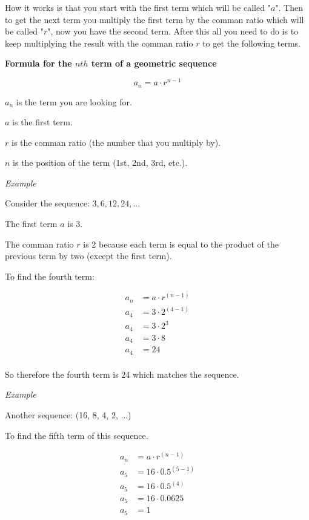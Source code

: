 \documentclass[]{book}
\begin{document}
 How it works is that you start with the first term which will be called "$ a  $". 
Then to get the next term you multiply the first term by the comman ratio which will be called  "$ r  $", now you have the second term.
After this all you need to do is to keep multiplying the result with the comman ratio $ r  $ to get the following terms.

\textbf{Formula for the  $ n th  $ term of a geometric sequence}

$$ a_{n} = a \cdot r^{n-1}$$

 $ a_{n} $ is the term you are looking for.

 $ a  $ is the first term.

 $ r $ is the comman ratio (the number that you multiply by). 

 $ n $ is the position of the term (1st, 2nd, 3rd, etc.).

\vspace{0.5 cm}
\textit{Example}

Consider the sequence:  $ 3, 6, 12, 24, ...  $

The first term  $a$ is 3.
 
The comman ratio  $ r  $ is 2 because each term is equal to the product of the previous term by two (except the first term). 

To find the fourth term:

\begin{align}
    a_{n} &= a \cdot r^{(n-1)} \\
    a_{4} &= 3 \cdot 2^{(4-1)} \\
    a_{4} &= 3 \cdot 2^{3} \\
    a_{4} &= 3 \cdot 8 \\
    a_{4} &= 24 \\
\end{align}

So therefore the fourth term is 24 which matches the sequence.

\vspace{0.5 cm}
\textit{Example}

Another sequence: (16, 8, 4, 2, ...)

To find the fifth term of this sequence.

\begin{align}
    a_{n} &= a \cdot r^{(n-1)} \\
    a_{5} &= 16 \cdot 0.5^{(5-1)} \\
    a_{5} &= 16 \cdot 0.5^{(4)} \\
    a_{5} &= 16 \cdot 0.0625 \\
    a_{5} &=1 \\
\end{align}
 
\end{document}

